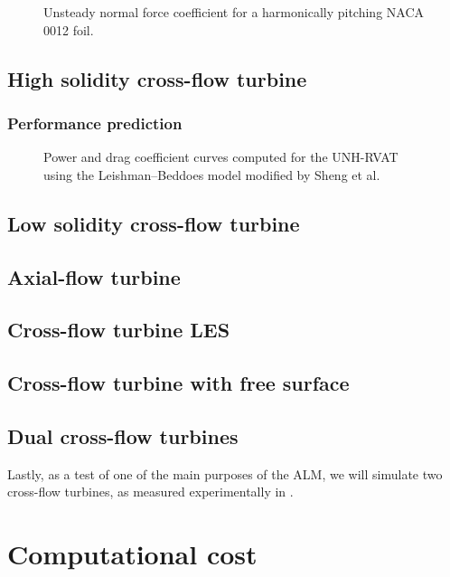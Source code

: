 \begin{figure}
    \caption{Unsteady normal force coefficient for a harmonically pitching NACA
        0012 foil.}
    
    \label{fig:pitching-cn}
\end{figure}


\subsection{High solidity cross-flow turbine}

\subsubsection{Performance prediction}

\begin{figure}
    \caption{Power and drag coefficient curves computed for the UNH-RVAT using
        the Leishman--Beddoes model modified by Sheng et al.}
    
    \label{fig:RVAT-ALM-perf-curves}
\end{figure}

\subsection{Low solidity cross-flow turbine}


\subsection{Axial-flow turbine}


\subsection{Cross-flow turbine LES}


\subsection{Cross-flow turbine with free surface}


\subsection{Dual cross-flow turbines}

Lastly, as a test of one of the main purposes of the ALM, we will simulate two cross-flow turbines, as measured experimentally in \cite{Li2010}.


\section{Computational cost}


